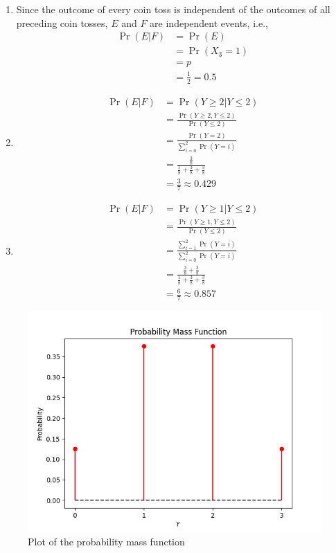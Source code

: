 \documentclass[journal,12pt,twocolumn]{IEEEtran}
\providecommand{\pr}[1]{\ensuremath{\Pr\left(#1\right)}}
\begin{document}
	\begin{enumerate}[label=(\roman*)]
	\item Since the outcome of every coin toss is independent of the outcomes of all preceding coin tosses, $E$ and $F$ are independent events, i.e.,
	\begin{align}
		\pr{E|F} &= \pr{E} \\
		&= \pr{X_3 = 1} \\
		&= p \\
		&= \frac12 = 0.5
	\end{align}
	
	\item
	\begin{align}
		\pr{E|F} &= \pr{Y \ge 2 | Y \le 2} \\
		&= \frac{\pr{Y \ge 2 , Y \le 2}}{\pr{Y \le 2}} \\
		&= \frac{\pr{Y = 2}}{\sum_{i=0}^2 \pr{Y = i}} \\
		&= \frac{\frac38}{\frac18 + \frac38 + \frac38} \\
		&= \frac37 \approx 0.429
	\end{align}
	
	\item
	\begin{align}
		\pr{E|F} &= \pr{Y \ge 1 | Y \le 2} \\
		&= \frac{\pr{Y \ge 1 , Y \le 2}}{\pr{Y \le 2}} \\
		&= \frac{\sum_{i=1}^2 \pr{Y = i}}{\sum_{i=0}^2 \pr{Y = i}} \\
		&= \frac{\frac38 + \frac38}{\frac18 + \frac38 + \frac38} \\
		&= \frac67 \approx 0.857
	\end{align}
	\end{enumerate}	
	
	\begin{figure}[!ht]
		\centering
		\includegraphics[width=\columnwidth]{figs/fig-1.png}
		\caption{Plot of the probability mass function}
		\label{fig1}
	\end{figure}
	
\end{document}
